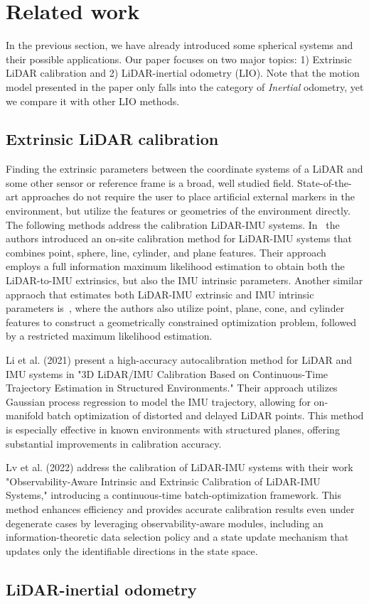 \section{Related work}

In the previous section, we have already introduced some spherical systems and their possible applications.
Our paper focuses on two major topics: 1) Extrinsic LiDAR calibration and 2) LiDAR-inertial odometry (LIO).
Note that the motion model presented in the paper only falls into the category of \textit{Inertial} odometry, yet we compare it with other LIO methods.
 
\subsection{Extrinsic LiDAR calibration}

Finding the extrinsic parameters between the coordinate systems of a LiDAR and some other sensor or reference frame is a broad, well studied field.
State-of-the-art approaches do not require the user to place artificial external markers in the environment, but utilize the features or geometries of the environment directly.
The following methods address the calibration LiDAR-IMU systems.
In~\cite{Liu2020NovelMultifeature} the authors introduced an on-site calibration method for LiDAR-IMU systems that combines point, sphere, line, cylinder, and plane features.
Their approach employs a full information maximum likelihood estimation to obtain both the LiDAR-to-IMU extrinsics, but also the IMU intrinsic parameters.
Another similar appraoch that estimates both LiDAR-IMU extrinsic and IMU intrinsic parameters is~\cite{Liu2019ErrorModeling}, where the authors also utilize point, plane, cone, and cylinder features to construct a geometrically constrained optimization problem, followed by a restricted maximum likelihood estimation.


Li et al. (2021) present a high-accuracy autocalibration method for LiDAR and IMU systems in "3D LiDAR/IMU Calibration Based on Continuous-Time Trajectory Estimation in Structured Environments." Their approach utilizes Gaussian process regression to model the IMU trajectory, allowing for on-manifold batch optimization of distorted and delayed LiDAR points. This method is especially effective in known environments with structured planes, offering substantial improvements in calibration accuracy.

Lv et al. (2022) address the calibration of LiDAR-IMU systems with their work "Observability-Aware Intrinsic and Extrinsic Calibration of LiDAR-IMU Systems," introducing a continuous-time batch-optimization framework. This method enhances efficiency and provides accurate calibration results even under degenerate cases by leveraging observability-aware modules, including an information-theoretic data selection policy and a state update mechanism that updates only the identifiable directions in the state space.

\subsection{LiDAR-inertial odometry}